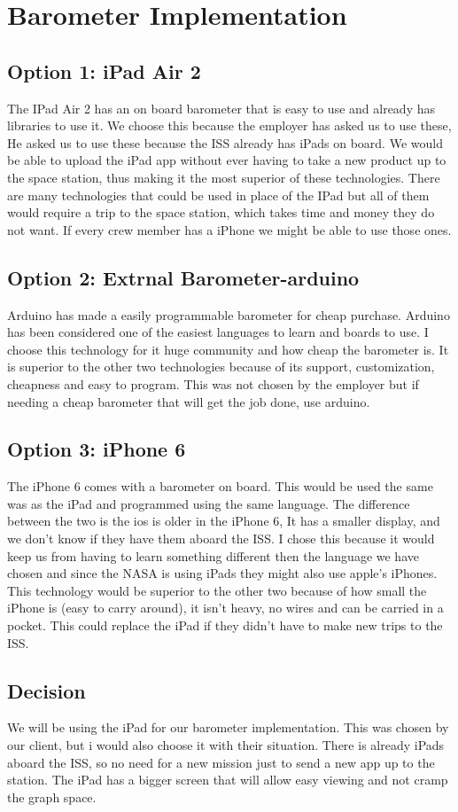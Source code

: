 \documentclass[onecolumn, draftclsnofoot,10pt, compsoc]{IEEEtran}
\begin{document}
\section{Barometer Implementation}
\subsection{Option 1: iPad Air 2}
The IPad Air 2 has an on board barometer that is easy to use and already has libraries to use it.
We choose this because the employer has asked us to use these, He asked us to use these because the ISS already has iPads on board.
We would be able to upload the iPad app without ever having to take a new product up to the space station, thus making it the most superior of these technologies.
 There are many technologies that could be used in place of the IPad but all of them would require a trip to the space station, which takes time and money they do not want.
 If every crew member has a iPhone we might be able to use those ones.

\subsection{Option 2:	Extrnal Barometer-arduino }
Arduino has made a easily programmable barometer for cheap purchase.
 Arduino has been considered one of the easiest languages to learn and boards to use.
I choose this technology for it huge community and how cheap the barometer is.
 It is superior to the other two technologies because of its support, customization, cheapness and easy to program.
This was not chosen by the employer but if needing a cheap barometer that will get the job done, use arduino.

\subsection{Option 3: iPhone 6}
The iPhone 6 comes with a barometer on board.
 This would be used the same was as the iPad and programmed using the same language.
 The difference between the two is the ios is older in the iPhone 6, It has a smaller display, and we don't know if they have them aboard the ISS.
 I chose this because it would keep us from having to learn something different then the language we have chosen and since the NASA is using iPads they might also use apple's iPhones.
 This technology would be superior to the other two because of how small the iPhone is (easy to carry around), it isn't heavy, no wires and can be carried in a pocket.
This could replace the iPad if they didn't have to make new trips to the ISS.
\subsection{Decision}
We will be using the iPad for our barometer implementation.
 This was chosen by our client, but i would also choose it with their situation.
 There is already iPads aboard the ISS, so no need for a new mission just to send a new app up to the station.
The iPad has a bigger screen that will allow easy viewing and not cramp the graph space.
\newpage


\end{document}
